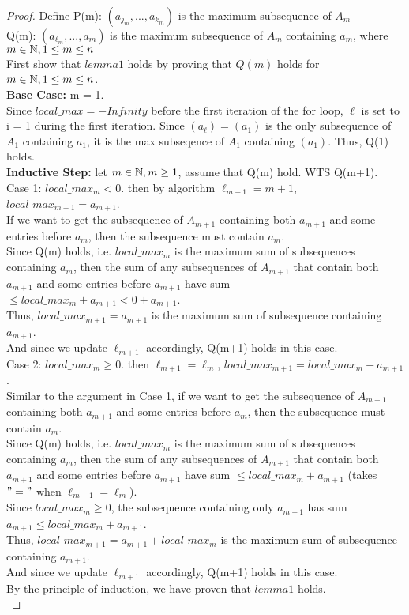 \documentclass[11pt]{article}
\begin{document}
\begin{enumerate}
    \begin{proof}
    Define P(m): $(a_{j_m},...,a_{k_m})$ is the maximum subsequence of $A_m$\\
    Q(m): $(a_{\ell_m},...,a_{m})$ is the maximum subsequence of $A_m$ containing $a_{m}$, where $m \in \mathbb N, 1\leq m \leq n$ \\[2ex]
    First show that $lemma1$ holds by proving that $Q(m)$ holds for $m \in \mathbb N, 1\leq m \leq n$.\\
    \textbf{Base Case: } m = 1. \\
    Since $local\_max = -Infinity$ before the first iteration of the for loop, $\ell$ is set to i = 1 during the first iteration. Since $(a_\ell) = (a_1)$ is the only subsequence of $A_1$ containing $a_1$, it is the max subseqence of $A_1$ containing $(a_1)$. Thus, Q(1) holds.\\[2ex]
    \textbf{Inductive Step:} let $m\in \mathbb N, m \geq 1$, assume that Q(m) hold. WTS Q(m+1).\\[2ex]
    Case 1: $local\_max_m < 0$. then by algorithm $\ell_{m+1} = m+1$,  $local\_max_{m+1} = a_{m+1}$.\\
    If we want to get the subsequence of $A_{m+1}$ containing both $a_{m+1}$ and some entries before $a_m$, then the subsequence must contain $a_m$.\\
    Since Q(m) holds, i.e. $local\_max_m$ is the maximum sum of subsequences containing $a_m$, then the sum of any subsequences of $A_{m+1}$ that contain both $a_{m+1}$ and some entries before $a_{m+1}$ have sum $\leq local\_max_m + a_{m+1} < 0 + a_{m+1}$.\\
    Thus, $local\_max_{m+1} = a_{m+1}$ is the maximum sum of subsequence containing $a_{m+1}$.\\
    And since we update $\ell_{m+1}$ accordingly, Q(m+1) holds in this case.\\
    
    Case 2: $local\_max_m \geq 0$. then $\ell_{m+1} = \ell_{m}$, $local\_max_{m+1} = local\_max_{m} + a_{m+1}$.\\
    Similar to the argument in Case 1, if we want to get the subsequence of $A_{m+1}$ containing both $a_{m+1}$ and some entries before $a_m$, then the subsequence must contain $a_m$.\\
    Since Q(m) holds, i.e. $local\_max_m$ is the maximum sum of subsequences containing $a_m$, then the sum of any subsequences of $A_{m+1}$ that contain both $a_{m+1}$ and some entries before $a_{m+1}$ have sum $\leq local\_max_m + a_{m+1}$ (takes $"="$ when $\ell_{m+1} = \ell_{m}$).  \\
    Since $local\_max_{m} \geq 0$, the subsequence containing only $a_{m+1}$ has sum $a_{m+1} \leq local\_max_m + a_{m+1}$.\\
    Thus, $local\_max_{m+1} = a_{m+1}+ local\_max_m$ is the maximum sum of subsequence containing $a_{m+1}$.\\
    And since we update $\ell_{m+1}$ accordingly, Q(m+1) holds in this case.\\
    By the principle of induction, we have proven that $lemma 1$ holds.\\[2ex]
    

\end{proof}
\end{enumerate}
\end{document}
